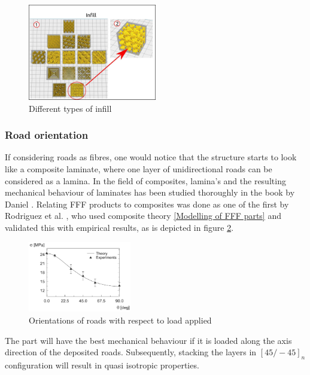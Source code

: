 \begin{figure}[H]
    \centering
    \includegraphics[width=0.5\textwidth]{chapter_2/figures/Infillbetter.jpg}
    \caption{Different types of infill \cite{UltimakerSpeed}}
    \label{fig:Infill}
\end{figure}

\subsubsection{Road orientation}
If considering roads as fibres, one would notice that the structure starts to look like a composite laminate, where one layer of unidirectional roads can be considered as a lamina. In the field of composites, lamina's and the resulting mechanical behaviour of laminates has been studied thoroughly in the book by Daniel \cite{Ishai2006EngineeringMaterials}.
Relating FFF products to composites was done as one of the first by Rodriguez et al. \cite{Rodriguez2003MechanicalModeling}, who used composite theory \ref{Modelling of FFF parts} and validated this with empirical results, as is depicted in figure \ref{fig:Orientation}.

\begin{figure}[H]
    \centering
    \includegraphics[width=0.4\textwidth]{chapter_2/figures/Orientation.PNG}
    \caption{Orientations of roads with respect to load applied \cite{Rodriguez2003MechanicalModeling}}
    \label{fig:Orientation}
\end{figure}

The part will have the best mechanical behaviour if it is loaded along the axis direction of the deposited roads. Subsequently, stacking the layers in  $[45/-45]_n$ configuration will result in quasi isotropic properties.

